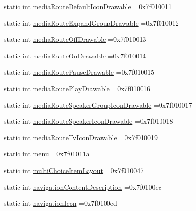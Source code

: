 \begin{DoxyCompactItemize}
\item 
static int \hyperlink{classandroid_1_1support_1_1v7_1_1mediarouter_1_1R_1_1attr_a7345df6b560c834b09e5e2adc2bdd783}{media\+Route\+Default\+Icon\+Drawable} =0x7f010011
\item 
static int \hyperlink{classandroid_1_1support_1_1v7_1_1mediarouter_1_1R_1_1attr_a6a01e3dd0b8440d79da229cf581c5c37}{media\+Route\+Expand\+Group\+Drawable} =0x7f010012
\item 
static int \hyperlink{classandroid_1_1support_1_1v7_1_1mediarouter_1_1R_1_1attr_ac9789262a47a7752080a9fb4574c4ede}{media\+Route\+Off\+Drawable} =0x7f010013
\item 
static int \hyperlink{classandroid_1_1support_1_1v7_1_1mediarouter_1_1R_1_1attr_a37116eabdcf3dce114f58601d0176f0d}{media\+Route\+On\+Drawable} =0x7f010014
\item 
static int \hyperlink{classandroid_1_1support_1_1v7_1_1mediarouter_1_1R_1_1attr_aa797097a0b224336ab6d78fedc5e8de3}{media\+Route\+Pause\+Drawable} =0x7f010015
\item 
static int \hyperlink{classandroid_1_1support_1_1v7_1_1mediarouter_1_1R_1_1attr_a12d4fc82a43e3340534cafccd0708ac6}{media\+Route\+Play\+Drawable} =0x7f010016
\item 
static int \hyperlink{classandroid_1_1support_1_1v7_1_1mediarouter_1_1R_1_1attr_a83f7a48bf16f162f35fea6edca14a346}{media\+Route\+Speaker\+Group\+Icon\+Drawable} =0x7f010017
\item 
static int \hyperlink{classandroid_1_1support_1_1v7_1_1mediarouter_1_1R_1_1attr_ab982cb1d398dded1c4312781922bcd01}{media\+Route\+Speaker\+Icon\+Drawable} =0x7f010018
\item 
static int \hyperlink{classandroid_1_1support_1_1v7_1_1mediarouter_1_1R_1_1attr_a5b8b523fed90b8bae28af7246b02ef8a}{media\+Route\+Tv\+Icon\+Drawable} =0x7f010019
\item 
static int \hyperlink{classandroid_1_1support_1_1v7_1_1mediarouter_1_1R_1_1attr_af562bc4c0c7889d849b35009c24ff701}{menu} =0x7f01011a
\item 
static int \hyperlink{classandroid_1_1support_1_1v7_1_1mediarouter_1_1R_1_1attr_a81ad05b4e1a2ef405bde7ea12bd32b7d}{multi\+Choice\+Item\+Layout} =0x7f010047
\item 
static int \hyperlink{classandroid_1_1support_1_1v7_1_1mediarouter_1_1R_1_1attr_aab82fbda26602ce100437b76fb07a3a1}{navigation\+Content\+Description} =0x7f0100ee
\item 
static int \hyperlink{classandroid_1_1support_1_1v7_1_1mediarouter_1_1R_1_1attr_a0b5494d37e9e2b02cca76a9260de97ba}{navigation\+Icon} =0x7f0100ed

\end{DoxyCompactItemize}
